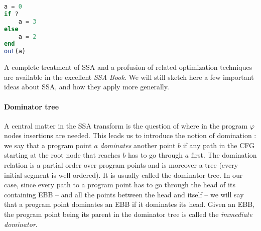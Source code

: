 \documentclass[11pt]{article}
\renewcommand{\phi}{\varphi}
\begin{document}
\begin{minipage}[t]{0.20\linewidth}
\begin{lstlisting}[language=julia]
a = 0
if ?
    a = 3
else
    a = 2
end
out(a)
\end{lstlisting}
\end{minipage}
\begin{minipage}[t]{0.30\linewidth}
\null
{}
\end{minipage}

\hfill

A complete treatment of SSA and a profusion of related optimization techniques are available in the excellent \emph{SSA Book}\cite{ssa-book}. We will still sketch here a few important ideas about SSA, and how they apply more generally.

\paragraph{Dominator tree} A central matter in the SSA transform is the question of where in the program $\phi$ nodes insertions are needed.
This leads us to introduce the notion of domination : we say that a program point $a$ \emph{dominates} another point $b$ if any path in the CFG starting at the root node that reaches $b$ has to go through $a$ first. The domination relation is a partial order over program points and is moreover a tree (every initial segment is well ordered). It is usually called the dominator tree. In our case, since every path to a program point has to go through the head of its containing EBB -- and all the points between the head and itself -- we will say that a program point dominates an EBB if it dominates its head. Given an EBB, the program point being its parent in the dominator tree is called the \emph{immediate dominator}.
\end{document}
